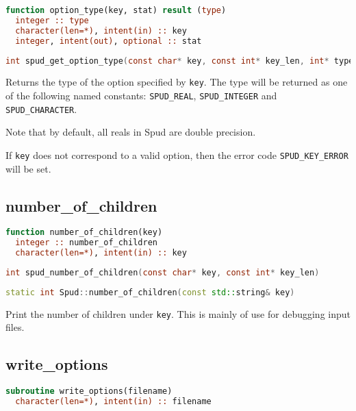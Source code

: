 \documentclass[a4paper, 11pt]{book}
\begin{document}
\begin{lstlisting}[language=fortran]
function option_type(key, stat) result (type)
  integer :: type
  character(len=*), intent(in) :: key
  integer, intent(out), optional :: stat
\end{lstlisting}

\begin{lstlisting}[language=C]
int spud_get_option_type(const char* key, const int* key_len, int* type)  
\end{lstlisting}

Returns the type of the option specified by \lstinline+key+. The type will
be returned as one of the following named constants: 
\lstinline+SPUD_REAL+, \lstinline+SPUD_INTEGER+ and
\lstinline+SPUD_CHARACTER+. 

Note that by default, all reals in Spud are
double precision.

If \lstinline+key+ does not correspond to a valid option, then the error
code \lstinline+SPUD_KEY_ERROR+ will be set.

\subsection{number\_of\_children}

\begin{lstlisting}[language=Fortran]
function number_of_children(key)
  integer :: number_of_children
  character(len=*), intent(in) :: key
\end{lstlisting}

\begin{lstlisting}[language=C]
int spud_number_of_children(const char* key, const int* key_len)
\end{lstlisting}

\begin{lstlisting}[language=C++]
static int Spud::number_of_children(const std::string& key)
\end{lstlisting}

Print the number of children under \lstinline+key+. This is mainly of use
for debugging input files.

\subsection{write\_options}

\begin{lstlisting}[language=fortran]
subroutine write_options(filename) 
  character(len=*), intent(in) :: filename
\end{lstlisting}
\end{document}
